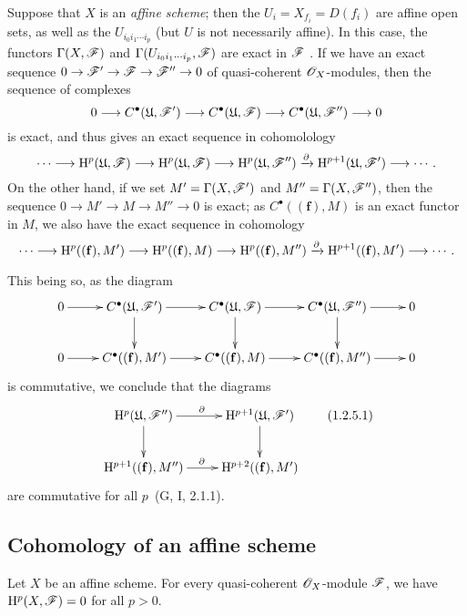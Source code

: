 \begin{rmk}[1.2.5]
\label{3.1.2.5}
Suppose that $X$ is an \emph{affine scheme}; then the $U_i=X_{f_i}=D(f_i)$ are affine open sets, as well as the $U_{i_0 i_1\cdots i_p}$ (but $U$ is not necessarily affine).
In this case, the functors $\Gamma(X,\mathscr{F})$ and $\Gamma(U_{i_0 i_1\cdots i_p},\mathscr{F})$ are exact in $\mathscr{F}$ .
If we have an exact sequence $0\to\sh{F}'\to\sh{F}\to\sh{F}''\to 0$ of quasi-coherent $\mathscr{O}_X$-modules, then the sequence of complexes
\[
  0\to C^\bullet(\fk{U},\sh{F}')\to C^\bullet(\fk{U},\sh{F})\to C^\bullet(\fk{U},\sh{F}'')\to 0
\]
is exact, and thus gives an exact sequence in cohomolology
\[
  \cdots\to\HH^p(\fk{U},\sh{F})\to\HH^p(\fk{U},\sh{F})\to\HH^p(\fk{U},\sh{F}'')\xrightarrow{\partial}\HH^{p+1}(\fk{U},\sh{F}')\to\cdots.
\]
On the other hand, if we set $M'=\Gamma(X,\mathscr{F}')$ and $M''=\Gamma(X,\mathscr{F}'')$, then the sequence $0\to M'\to M\to M''\to 0$ is exact; as $C^\bullet((\mathbf{f}),M)$ is an exact functor in $M$, we also have the exact sequence in cohomology
\[
  \cdots\to\HH^p((\mathbf{f}),M')\to\HH^p((\mathbf{f}),M)\to\HH^p((\mathbf{f}),M'')\xrightarrow{\partial}\HH^{p+1}((\mathbf{f}),M')\to\cdots.
\]

This being so, as the diagram
\[
  \xymatrix{
    0\ar[r] &
    C^\bullet(\fk{U},\sh{F}')\ar[r]\ar[d] &
    C^\bullet(\fk{U},\sh{F})\ar[r]\ar[d] &
    C^\bullet(\fk{U},\sh{F}'')\ar[r]\ar[d] &
    0\\
    0\ar[r] &
    C^\bullet((\mathbf{f}),M')\ar[r] &
    C^\bullet((\mathbf{f}),M)\ar[r] &
    C^\bullet((\mathbf{f}),M'')\ar[r] &
    0
  }
\]
is commutative, we conclude that the diagrams
\[
  \xymatrix{
    \HH^p(\fk{U},\sh{F}'')\ar[r]^\partial\ar[d] &
    \HH^{p+1}(\fk{U},\sh{F}')\ar[d]\\
    \HH^{p+1}((\mathbf{f}),M'')\ar[r]^\partial &
    \HH^{p+2}((\mathbf{f}),M')
  }
  \tag{1.2.5.1}
\]
are commutative for all $p$~(G, I, 2.1.1).
\end{rmk}

\subsection{Cohomology of an affine scheme}
\label{subsection:3.1.3}

\begin{thm}[1.3.1]
\label{3.1.3.1}
Let $X$ be an affine scheme.
For every quasi-coherent $\mathscr{O}_X$-module $\mathscr{F}$, we have $\mathrm{H}^p(X,\mathscr{F})=0$ for all $p>0$.
\end{thm}

